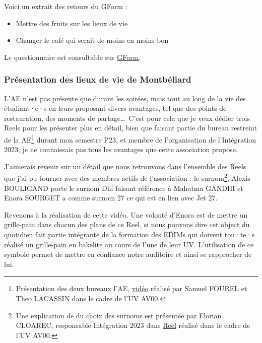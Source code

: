Voici un extrait des retours du GForm :
\begin{itemize}
    \item Mettre des fruits sur les lieux de vie
    \item Changer le café qui serait de moins en moins bon
\end{itemize}


Le questionnaire est consultable sur \href{https://docs.google.com/forms/d/e/1FAIpQLSfOkOUDseCfWcLwP2uz_amd-i2v_5OucU92uZAUewR6VN_P_A/viewform?usp=sf_link}{GForm}.

\subsubsection{Présentation des lieux de vie de Montbéliard}\label{subsubsec:montbeliard}

L'\gls{AE} n'est pas présente que durant les soirées, mais tout au long de la vie des étudiant·e·s en leurs proposant divers avantages, tel que des points de restauration, des moments de partage\ldots\
C'est pour cela que je veux dédier trois Reels pour les présenter plus en détail, bien que faisant partie du bureau restreint de la \gls{AE}\footnote{Présentation des deux bureaux l'\gls{AE}, \href{https://www.instagram.com/reel/CeT9t0uAxrS/?utm_source=ig_web_copy_link&igshid=MzRlODBiNWFlZA==}{vidéo} réalisé par Samuel FOUREL et Theo LACASSIN dans le cadre de l'UV AV00.} durant mon semestre P23, et membre de l'organisation de l'Intégration 2023, je ne connaissais pas tous les avantages que cette association propose.

J'aimerais revenir sur un détail que nous retrouvons dans l'ensemble des Reels que j'ai pu tourner avec des membres actifs de l'association : le surnom\footnote{Une explication de du choix des surnoms est présentée par Florian CLOAREC, responsable Intégration 2023 dans \href{https://www.instagram.com/reel/Cws1eRdr-wV/?utm_source=ig_web_copy_link&igshid=MzRlODBiNWFlZA==}{Reel} réalisé dans le cadre de l'UV AV00.}, Alexis BOULIGAND porte le surnom Dhi faisant référence à Mahatma GANDHI et Enora SOURGET a comme surnom 27 ce qui est en lien avec Jet 27.

Revenons à la réalisation de cette vidéo.
Une volonté d'Enora est de mettre un grille-pain dans chacun des plans de ce Reel, si nous pouvons dire cet object du quotidien fait partie intégrante de la formation des EDIMs qui doivent tou·te·s réalisé un grille-pain en bakelite au cours de l'une de leur UV.
L'utilisation de ce symbole permet de mettre en confiance notre auditoire et ainsi se rapprocher de lui.

